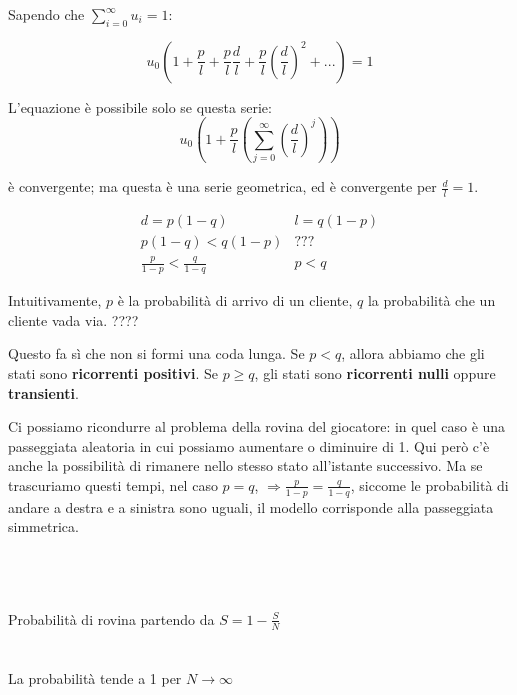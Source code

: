 \documentclass[a4paper,12pt]{book}
\begin{document}
Sapendo che $ \sum_{i=0}^{\infty} u_i = 1 $:

$$ u_0 \left( 1 + \frac{p}{l} + \frac{p}{l}\frac{d}{l} + \frac{p}{l} \left(\frac{d}{l}\right)^2 + ... \right) = 1 $$

L'equazione è possibile solo se questa serie:
$$ u_0 \left(1 + \frac{p}{l} \left( \sum_{j=0}^{\infty} \left(\frac{d}{l}\right)^j\right)\right) $$

è convergente; ma questa è una serie geometrica, ed è convergente per $ \frac{d}{l} = 1 $.

$$ \begin{array}{cc}
d = p(1-q) & l = q(1-p) \\
p(1-q) < q(1-p) & ??? \\ %
\frac{p}{1-p} < \frac{q}{1-q} & p < q
\end{array} $$

Intuitivamente, $ p $ è la probabilità di arrivo di un cliente, $ q $ la probabilità che un cliente vada via. ???? %

Questo fa sì che non si formi una coda lunga. Se $ p < q $, allora abbiamo che gli stati sono \textbf{ricorrenti positivi}. Se $ p \ge q $, gli stati sono \textbf{ricorrenti nulli} oppure \textbf{transienti}. 

Ci possiamo ricondurre al problema della rovina del giocatore: in quel caso è una passeggiata aleatoria in cui possiamo aumentare o diminuire di 1. Qui però c'è anche la possibilità di rimanere nello stesso stato all'istante successivo. Ma se trascuriamo questi tempi, nel caso $ p = q $, $ \Rightarrow \frac{p}{1-p} = \frac{q}{1-q} $, siccome le probabilità di andare a destra e a sinistra sono uguali, il modello corrisponde alla passeggiata simmetrica. 

\begin{multicols}{2}
	\\
	\\
	\\
	Probabilità di rovina partendo da $S = 1- \frac{S}{N} $\\ 
	\\
	\\
	La probabilità tende a 1 per $ N \to \infty $
\end{multicols}
\end{document}
